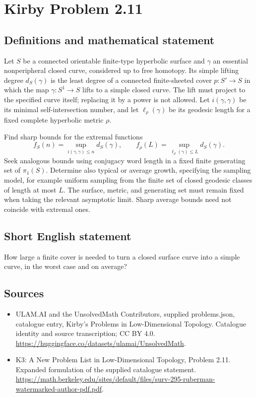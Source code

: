 \documentclass[11pt,a4paper]{article}
\begin{document}
\section*{Kirby Problem 2.11}\label{statement}

\subsection{Definitions and mathematical statement}
Let $S$ be a connected orientable finite-type hyperbolic surface and $\gamma$ an
essential nonperipheral closed curve, considered up to free homotopy.
Its simple lifting degree $d_S(\gamma)$ is the least degree of a connected
finite-sheeted cover $p:S'\to S$ in which the map $\gamma:S^1\to S$ lifts to
a simple closed curve. The lift must project to the specified curve itself;
replacing it by a power is not allowed.
Let $i(\gamma,\gamma)$ be its minimal self-intersection number, and let
$\ell_\rho(\gamma)$ be its geodesic length for a fixed complete hyperbolic
metric $\rho$.

Find sharp bounds for the extremal functions
\[
f_S(n)=\sup_{i(\gamma,\gamma)\leq n}d_S(\gamma),\qquad
f_\rho(L)=\sup_{\ell_\rho(\gamma)\leq L}d_S(\gamma).
\]
Seek analogous bounds using conjugacy word length in a fixed finite generating
set of $\pi_1(S)$. Determine also typical or average growth, specifying the
sampling model, for example uniform sampling from the finite set of closed
geodesic classes of length at most $L$. The surface, metric, and generating
set must remain fixed when taking the relevant asymptotic limit. Sharp average
bounds need not coincide with extremal ones.
\subsection{Short English statement}
How large a finite cover is needed to turn a closed surface curve into a simple curve, in the worst case and on average?
\subsection{Sources}
\begin{itemize}
\item[S1] ULAM.AI and the UnsolvedMath Contributors, supplied problems.json, catalogue entry, Kirby's Problems in Low-Dimensional Topology. Catalogue identity and source transcription; CC BY 4.0.
\url{https://huggingface.co/datasets/ulamai/UnsolvedMath}.
\item[S2] K3: A New Problem List in Low-Dimensional Topology, Problem 2.11. Expanded formulation of the supplied catalogue statement.
\url{https://math.berkeley.edu/sites/default/files/surv-295-ruberman-watermarked-author-pdf.pdf}.
\end{itemize}
\end{document}
